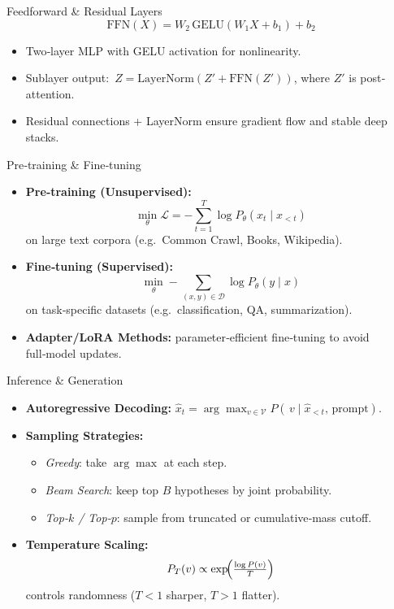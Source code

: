 \documentclass[german,10pt]{beamer}
\begin{document}
\begin{frame}{Feedforward \& Residual Layers}
  {\small
  \[
    \mathrm{FFN}(X)
    = W_2\,\mathrm{GELU}(W_1 X + b_1) + b_2
  \]
  }
  \vspace{-0.5em}
  \begin{itemize}
    \item Two‐layer MLP with GELU activation for nonlinearity.
    \item Sublayer output:
      \(\,Z = \mathrm{LayerNorm}(Z' + \mathrm{FFN}(Z'))\), where $Z'$ is post‐attention.
    \item Residual connections + LayerNorm ensure gradient flow and stable deep stacks.
  \end{itemize}
\end{frame}

\begin{frame}{Pre‑training \& Fine‑tuning}
  \begin{itemize}
    \item \textbf{Pre‑training (Unsupervised):}
      \[
        \min_\theta \mathcal{L}
        = -\sum_{t=1}^T \log P_\theta(x_t \mid x_{<t})
      \]
      on large text corpora (e.g.\ Common Crawl, Books, Wikipedia).
    \item \textbf{Fine‑tuning (Supervised):}
      \[
        \min_\theta -\sum_{(x,y)\in\mathcal D} \log P_\theta(y \mid x)
      \]
      on task‐specific datasets (e.g.\ classification, QA, summarization).
    \item \textbf{Adapter/LoRA Methods:} parameter‐efficient fine‑tuning to avoid full‑model updates.
  \end{itemize}
\end{frame}

\begin{frame}{Inference \& Generation}
  \begin{itemize}
    \item \textbf{Autoregressive Decoding:}
      \(\hat{x}_t = \arg\max_{v\in\mathcal V} P(\,v\mid \hat{x}_{<t},\,\text{prompt})\).
    \item \textbf{Sampling Strategies:}
      \begin{itemize}
        \item \emph{Greedy}: take $\arg\max$ at each step.
        \item \emph{Beam Search}: keep top $B$ hypotheses by joint probability.
        \item \emph{Top‑$k$ / Top‑$p$}: sample from truncated or cumulative‐mass cutoff.
      \end{itemize}
    \item \textbf{Temperature Scaling:}
      \[
        P_T(v) \propto \exp\!\Bigl(\tfrac{\log P(v)}{T}\Bigr)
      \]
      controls randomness ($T<1$ sharper, $T>1$ flatter).
  \end{itemize}
\end{frame}
\end{document}

